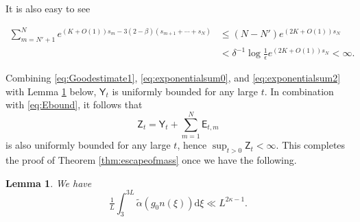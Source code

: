 \documentclass[12pt]{amsart}
\newtheorem{lem}[thm]{Lemma}
\theoremstyle{definition}
\theoremstyle{remark}
\numberwithin{equation}{section}
\newcommand{\dd}{\mathrm{d}}
\newcommand{\eqlabel}[2]
{
\begin{equation}
{#2}\label{#1}
\end{equation}
}
\begin{document}
    It is also easy to see
    \eqlabel{eq:exponentialsum2}{\begin{aligned}
        \displaystyle\sum_{m=N'+1}^{N}e^{(K+O(1))s_m-3(2-\beta)(s_{m+1}+\cdots+s_{N})}&\leq (N-N')e^{(2K+O(1))s_N}\\& <\delta^{-1}\log\frac{1}{\epsilon}e^{(2K+O(1))s_N}<\infty.
    \end{aligned}}
  
    Combining \eqref{eq:Goodestimate1}, \eqref{eq:exponentialsum0}, and \eqref{eq:exponentialsum2} with Lemma \ref{lem:initialtildealphaaverage} below, $\mathsf{Y}_t$ is uniformly bounded for any large $t$. In combination with \eqref{eq:Ebound}, it follows that
    $$\mathsf{Z}_t=\mathsf{Y}_t+\sum_{m=1}^{N}\mathsf{E}_{t,m}$$
    is also uniformly bounded for any large $t$, hence $\displaystyle\sup_{t>0}\mathsf{Z}_t<\infty$.
    This completes the proof of Theorem \ref{thm:escapeofmass} once we have the following.

  \begin{lem}
    \label{lem:initialtildealphaaverage}
    We have
    \begin{equation}
      \label{eq:initialtildealphaaverage}
      \tfrac{1}{L} \int_3^{3L} \tilde{\alpha}(g_0 n(\xi)) \dd \xi \ll L^{2\kappa -1}. 
    \end{equation}
  \end{lem}
\end{document}
